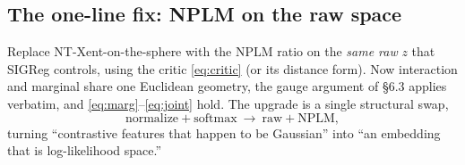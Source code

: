 \documentclass[11pt]{article}
\begin{document}
\subsection{The one-line fix: NPLM on the raw space}
Replace NT-Xent-on-the-sphere with the NPLM ratio on the \emph{same raw} $z$ that
SIGReg controls, using the critic \eqref{eq:critic} (or its distance form). Now
interaction and marginal share one Euclidean geometry, the gauge argument of \S6.3
applies verbatim, and \eqref{eq:marg}--\eqref{eq:joint} hold. The upgrade is a
single structural swap,
\begin{equation}
\text{normalize}+\text{softmax}\ \longrightarrow\ \text{raw}+\text{NPLM},
\end{equation}
turning ``contrastive features that happen to be Gaussian'' into ``an embedding
that is log-likelihood space.''
\end{document}
